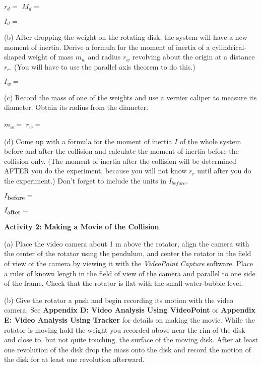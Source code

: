 \( r_{d} =\)  \hfill{}\( M_{d}= \) \hfill{}
\vspace{5mm}

\( I_{d}= \)
\vspace{5mm}

(b) After dropping the weight on the rotating disk, the system will have a new
moment of inertia. Derive a formula for the moment of inertia of a cylindrical-shaped weight of mass \( m_{w} \) and radius \( r_{w} \) revolving about the origin at a distance \( r_{r} \). (You will have to use the parallel axis theorem to do this.)
\vspace{5mm}

\( I_{w} =\)  
\vspace{10mm}

(c) Record the mass of one of the weights and use a vernier caliper to measure its diameter. Obtain its radius from the diameter.
\vspace{5mm}

\( m_{w} =\)  \hfill{}\(r_{w} =\) \hfill{}
\vspace{5mm}

(d) Come up with a formula for the moment of inertia $I$ of the whole system
before and after the collision and calculate the moment of inertia before the
collision only. (The moment of inertia after the collision will be determined AFTER you do the experiment, because you will not know \( r_{r} \) until after you do the experiment.) Don't forget to include the units in \( I_{before} \).
\vspace{5mm}

\( I_{\mbox{\small before}}= \) 
\vspace{5mm}

\( I_{\mbox{\small after}} =\)  
\vspace{5mm}

\textbf{Activity 2: Making a Movie of the Collision} 

(a) Place the video camera about 1 m above the rotator, align the camera with
the center of the rotator using the pendulum, and center the rotator in the
field of view of the camera by viewing it with the \textit{VideoPoint
Capture} software.
Place a ruler of known length in the field of view of the camera and parallel
to one side of the frame. Check that the rotator is flat with the small water-bubble level.

(b) Give the rotator a push and begin recording its motion with the video camera. See \textbf{Appendix D: Video Analysis Using VideoPoint} or \textbf{Appendix E: Video Analysis Using Tracker} for details on making the movie. While the rotator is moving hold the weight you recorded above near the rim of the disk and close to, but not quite
touching, the surface of the moving disk. After at least one revolution
of the disk drop the mass onto the disk and record the motion of
the disk for at least one revolution afterward. 

